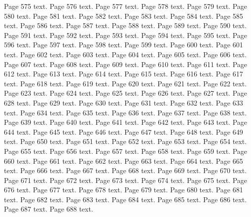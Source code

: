 \documentclass{article}
\begin{document}
Page 575 text.\newpage
Page 576 text.\newpage
Page 577 text.\newpage
Page 578 text.\newpage
Page 579 text.\newpage
Page 580 text.\newpage
Page 581 text.\newpage
Page 582 text.\newpage
Page 583 text.\newpage
Page 584 text.\newpage
Page 585 text.\newpage
Page 586 text.\newpage
Page 587 text.\newpage
Page 588 text.\newpage
Page 589 text.\newpage
Page 590 text.\newpage
Page 591 text.\newpage
Page 592 text.\newpage
Page 593 text.\newpage
Page 594 text.\newpage
Page 595 text.\newpage
Page 596 text.\newpage
Page 597 text.\newpage
Page 598 text.\newpage
Page 599 text.\newpage
Page 600 text.\newpage
Page 601 text.\newpage
Page 602 text.\newpage
Page 603 text.\newpage
Page 604 text.\newpage
Page 605 text.\newpage
Page 606 text.\newpage
Page 607 text.\newpage
Page 608 text.\newpage
Page 609 text.\newpage
Page 610 text.\newpage
Page 611 text.\newpage
Page 612 text.\newpage
Page 613 text.\newpage
Page 614 text.\newpage
Page 615 text.\newpage
Page 616 text.\newpage
Page 617 text.\newpage
Page 618 text.\newpage
Page 619 text.\newpage
Page 620 text.\newpage
Page 621 text.\newpage
Page 622 text.\newpage
Page 623 text.\newpage
Page 624 text.\newpage
Page 625 text.\newpage
Page 626 text.\newpage
Page 627 text.\newpage
Page 628 text.\newpage
Page 629 text.\newpage
Page 630 text.\newpage
Page 631 text.\newpage
Page 632 text.\newpage
Page 633 text.\newpage
Page 634 text.\newpage
Page 635 text.\newpage
Page 636 text.\newpage
Page 637 text.\newpage
Page 638 text.\newpage
Page 639 text.\newpage
Page 640 text.\newpage
Page 641 text.\newpage
Page 642 text.\newpage
Page 643 text.\newpage
Page 644 text.\newpage
Page 645 text.\newpage
Page 646 text.\newpage
Page 647 text.\newpage
Page 648 text.\newpage
Page 649 text.\newpage
Page 650 text.\newpage
Page 651 text.\newpage
Page 652 text.\newpage
Page 653 text.\newpage
Page 654 text.\newpage
Page 655 text.\newpage
Page 656 text.\newpage
Page 657 text.\newpage
Page 658 text.\newpage
Page 659 text.\newpage
Page 660 text.\newpage
Page 661 text.\newpage
Page 662 text.\newpage
Page 663 text.\newpage
Page 664 text.\newpage
Page 665 text.\newpage
Page 666 text.\newpage
Page 667 text.\newpage
Page 668 text.\newpage
Page 669 text.\newpage
Page 670 text.\newpage
Page 671 text.\newpage
Page 672 text.\newpage
Page 673 text.\newpage
Page 674 text.\newpage
Page 675 text.\newpage
Page 676 text.\newpage
Page 677 text.\newpage
Page 678 text.\newpage
Page 679 text.\newpage
Page 680 text.\newpage
Page 681 text.\newpage
Page 682 text.\newpage
Page 683 text.\newpage
Page 684 text.\newpage
Page 685 text.\newpage
Page 686 text.\newpage
Page 687 text.\newpage
Page 688 text.\newpage
\end{document}
